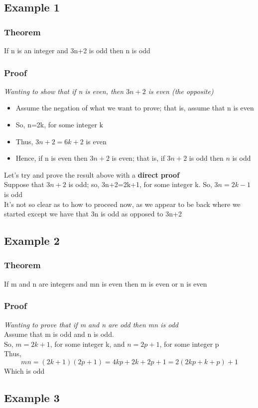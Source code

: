 \documentclass{article}[18pt]
\begin{document}
\subsection{Example 1}
\subsubsection{Theorem}
If n is an integer and 3n+2 is odd then n is odd
\subsubsection{Proof}
\textit{Wanting to show that if n is even, then $3n+2$ is even (the opposite)}
\begin{itemize}
	\item Assume the negation of what we want to prove; that is, assume that n is even
	\item So, n=2k, for some integer k
	\item Thus, $3n+2=6k+2$ is even
	\item Hence, if n is even then $3n+2$ is even; that is, if $3n+2$ is odd then $n$ is odd
\end{itemize}
Let's try and prove the result above with a \textbf{direct proof}\\
Suppose that $3n+2$ is odd; so, 3n+2=2k+1, for some integer k. So, $3n=2k-1$ is odd\\
It's not so clear as to how to proceed now, as we appear to be back where we started except we have that 3n is odd as opposed to 3n+2
\subsection{Example 2}
\subsubsection{Theorem}
If m and n are integers and mn is even then m is even or n is even
\subsubsection{Proof}
\textit{Wanting to prove that if m and n are odd then mn is odd}\\
Assume that m is odd and n is odd.\\
So, $m=2k+1$, for some integer k, and $n=2p+1$, for some integer p\\
Thus,
$$m n=(2 k+1)(2 p+1)=4 k p+2 k+2 p+1=2(2 k p+k+p)+1$$
Which is odd
\subsection{Example 3}
\end{document}
